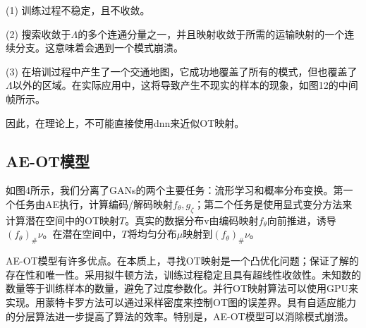 (1) 训练过程不稳定，且不收敛。

(2) 搜索收敛于$\Lambda$的多个连通分量之一，并且映射收敛于所需的运输映射的一个连续分支。这意味着会遇到一个模式崩溃。

(3) 在培训过程中产生了一个交通地图，它成功地覆盖了所有的模式，但也覆盖了$\Lambda$以外的区域。在实际应用中，这将导致产生不现实的样本的现象，如图12的中间帧所示。

因此，在理论上，不可能直接使用dnn来近似OT映射。

\subsection{AE-OT模型}

如图4所示，我们分离了GANs的两个主要任务：流形学习和概率分布变换。第一个任务由AE执行，计算编码/解码映射$f_{\theta}, g_{\zeta}$；第二个任务是使用显式变分方法来计算潜在空间中的OT映射$T$。真实的数据分布v由编码映射$f_{\theta}$向前推进，诱导$(f_{\theta})_{\#} \nu$。在潜在空间中，$T$将均匀分布$\mu$映射到$(f_{\theta})_{\#} \nu$。

AE-OT模型有许多优点。在本质上，寻找OT映射是一个凸优化问题；保证了解的存在性和唯一性。采用拟牛顿方法，训练过程稳定且具有超线性收敛性。未知数的数量等于训练样本的数量，避免了过度参数化。并行OT映射算法可以使用GPU来实现。用蒙特卡罗方法可以通过采样密度来控制OT图的误差界。具有自适应能力的分层算法进一步提高了算法的效率。特别是，AE-OT模型可以消除模式崩溃。